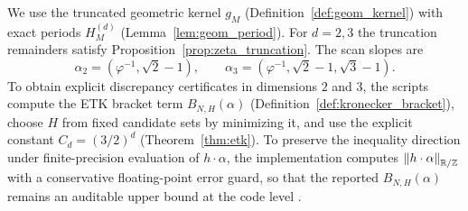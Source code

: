 \begin{sloppypar}
We use the truncated geometric kernel $g_M$ (Definition~\ref{def:geom_kernel}) with exact periods $H_M^{(d)}$ (Lemma~\ref{lem:geom_period}).
For $d=2,3$ the truncation remainders satisfy Proposition~\ref{prop:zeta_truncation}.
The scan slopes are
\[
\alpha_{2}=(\varphi^{-1},\sqrt{2}-1),
\qquad
\alpha_{3}=(\varphi^{-1},\sqrt{2}-1,\sqrt{3}-1).
\]
To obtain explicit discrepancy certificates in dimensions $2$ and $3$, the scripts compute the ETK bracket term $B_{N,H}(\alpha)$ (Definition~\ref{def:kronecker_bracket}), choose $H$ from fixed candidate sets by minimizing it, and use the explicit constant $C_d=(3/2)^d$ (Theorem~\ref{thm:etk}).
To preserve the inequality direction under finite-precision evaluation of $h\cdot\alpha$, the implementation computes $\left\lVert h\cdot\alpha\right\rVert_{\mathbb{R}/\mathbb{Z}}$ with a conservative floating-point error guard, so that the reported $B_{N,H}(\alpha)$ remains an auditable upper bound at the code level \cite{Higham2002}.
\end{sloppypar}

\begin{table}[t]
\centering
{}
\caption{$\zeta(2)$ realized via a two-dimensional scan and auditable truncation. The sampling certificate uses $\DNstar(P_N)\le C_2 B_{N,H}$ with $C_2=(3/2)^2$ and $\HKVar(g_M)=(2^2-1)(M-1)$. The ratio column is $|\overline{\avgN{\mathcal{P}}}_K-H_M^{(2)}|/(\HKVar(g_M)C_2B_{N,H})$.}
\label{tab:zeta2_scan}
\end{table}

\begin{table}[t]
\centering
{}
\caption{$\zeta(3)$ realized via a three-dimensional scan and auditable truncation. We use a certified reference $\zeta(3)_{\mathrm{ref}}$ defined as the midpoint of the interval $[H_{M_{\mathrm{ref}}}^{(3)},H_{M_{\mathrm{ref}}}^{(3)}+1/(2M_{\mathrm{ref}}^2)]$ with $M_{\mathrm{ref}}=200{,}000$. The sampling certificate uses $C_3=(3/2)^3$.}
\label{tab:zeta3_scan}
\end{table}

